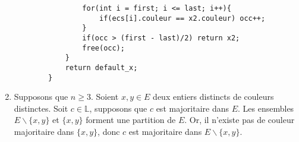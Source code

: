 \documentclass[10pt]{article}
\def\L{\mathbb L}
\begin{document}
\begin{enumerate}[start=9,label={\bfseries \arabic*}]
\begin{lstlisting}
				for(int i = first; i <= last; i++){
					if(ecs[i].couleur == x2.couleur) occ++;
				}
				if(occ > (first - last)/2) return x2;
				free(occ);
			}
			return default_x;
		}
		\end{lstlisting}
		\item Supposons que $n\geq 3$. Soient $x,y\in E$ deux entiers distincts de couleurs distinctes. Soit $c\in\L$, supposons que $c$ est majoritaire dans $E$. Les ensembles $E\backslash\lbrace x,y\rbrace$ et $\lbrace x,y\rbrace$ forment une partition de $E$. Or, il n'existe pas de couleur majoritaire dans $\lbrace x,y\rbrace$, donc $c$ est majoritaire dans $E\backslash\lbrace x,y\rbrace$.
	\end{enumerate}
\end{document}
